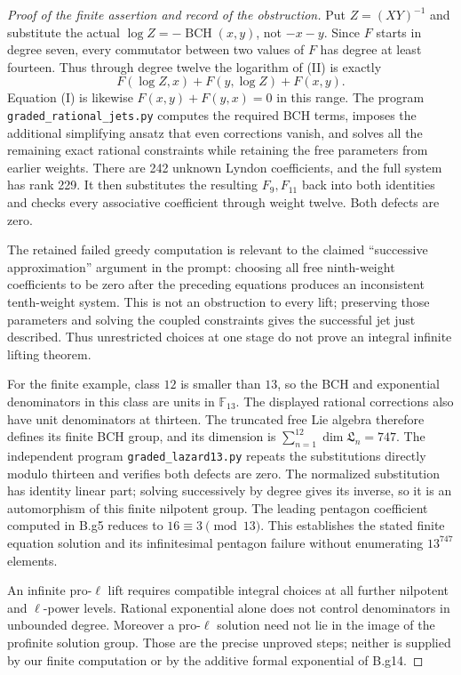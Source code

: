 \begin{proof}[Proof of the finite assertion and record of the obstruction]
Put $Z=(XY)^{-1}$ and substitute the actual
$\log Z=-\operatorname{BCH}(x,y)$, not $-x-y$.
Since $F$ starts in degree seven, every commutator between two values
of $F$ has degree at least fourteen.  Thus through degree twelve the
logarithm of (II) is exactly
\[
 F(\log Z,x)+F(y,\log Z)+F(x,y).
\]
Equation (I) is likewise $F(x,y)+F(y,x)=0$ in this range.
The program \nolinkurl{graded_rational_jets.py} computes the required
BCH terms, imposes the additional simplifying ansatz that even
corrections vanish, and solves all the remaining exact rational
constraints while retaining the free parameters from earlier weights.
There are 242 unknown Lyndon coefficients, and the full system has
rank 229.  It then substitutes the resulting $F_9,F_{11}$ back into
both identities and checks every associative coefficient through
weight twelve.  Both defects are zero.

The retained failed greedy computation is relevant to the claimed
``successive approximation'' argument in the prompt: choosing all
free ninth-weight coefficients to be zero after the preceding equations
produces an inconsistent tenth-weight system.  This is not an
obstruction to every lift; preserving those parameters and solving
the coupled constraints gives the successful jet just described.
Thus unrestricted choices at one stage do not prove an integral
infinite lifting theorem.

For the finite example, class $12$ is smaller than $13$, so the
BCH and exponential denominators in this class are units in
$\mathbb F_{13}$.  The displayed rational corrections also have
unit denominators at thirteen.  The truncated free Lie algebra
therefore defines its finite BCH group, and its dimension is
$\sum_{n=1}^{12}\dim\mathfrak L_n=747$.
The independent program \texttt{graded\_lazard13.py} repeats the
substitutions directly modulo thirteen and verifies both defects
are zero.  The normalized substitution has identity linear part;
solving successively by degree gives its inverse, so it is an
automorphism of this finite nilpotent group.  The leading pentagon
coefficient computed in B.g5 reduces to $16\equiv3\pmod{13}$.
This establishes the stated finite equation solution and its
infinitesimal pentagon failure without enumerating $13^{747}$ elements.

An infinite pro-$\ell$ lift requires compatible integral choices at
all further nilpotent and $\ell$-power levels.  Rational exponential
alone does not control denominators in unbounded degree.  Moreover
a pro-$\ell$ solution need not lie in the image of the profinite
solution group.  Those are the precise unproved steps; neither is
supplied by our finite computation or by the additive formal
exponential of B.g14.
\end{proof}

